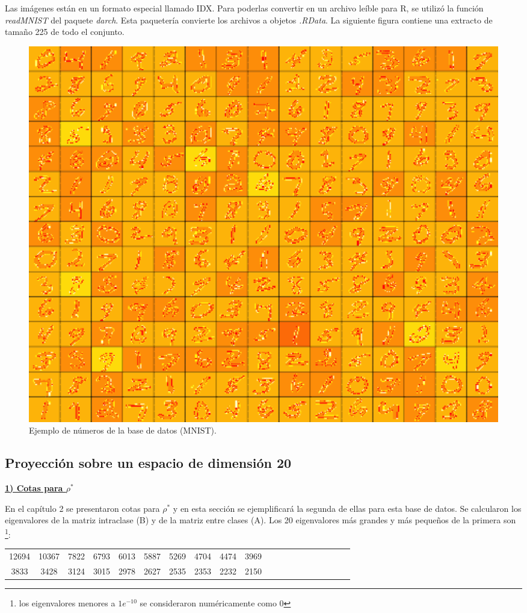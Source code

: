 Las imágenes están en un formato especial llamado IDX. Para poderlas convertir en un archivo leíble para R, se utilizó la función \textit{readMNIST} del paquete \textit{darch}. Esta paquetería convierte los archivos a objetos \textit{.RData}. La siguiente figura contiene una extracto de tamaño 225 de todo el conjunto.

\begin{figure}[!ht]
  \centering
	\includegraphics[width=1\textwidth]{Figures/Chapter4_numeros.png}	
  \caption{Ejemplo de números de la base de datos (MNIST).}
\end{figure}

\subsection{Proyección sobre un espacio de dimensión 20}

\underline{\textbf{1) Cotas para $\rho^*$}}

En el capítulo 2 se presentaron cotas para $\rho^*$ y en esta sección se ejemplificará la segunda de ellas para esta base de datos. Se calcularon los eigenvalores de la matriz intraclase (B) y de la matriz entre clases (A). Los 20 eigenvalores más grandes y más pequeños de la primera son \footnote{los eigenvalores menores a $1e^{-10}$ se consideraron numéricamente como 0}:

\begin{center}
\begin{tabular}{ | c | c|  c |c | c|  c |c | c|  c |c | c | c|  c |c | c|  c |c | c|  c |c |} 
\hline
12694 & 10367 & 7822 & 6793 & 6013 & 5887 & 5269 & 4704 & 4474 & 3969 \\
3833 & 3428 & 3124 & 3015 & 2978 & 2627 & 2535 & 2353 & 2232 & 2150 \\
\hline
\hline
\end{tabular}
\end{center}


